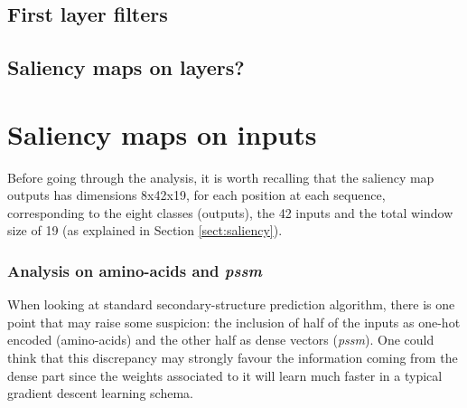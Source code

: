 \subsection{First layer filters}

\subsection*{Saliency maps on layers?}


\section{Saliency maps on inputs}

Before going through the analysis, it is worth recalling that the saliency map outputs has dimensions 8x42x19, for each position at each sequence, corresponding to the eight classes (outputs), the 42 inputs and the total window size of 19 (as explained in Section \ref{sect:saliency}).


\subsubsection*{Analysis on amino-acids and \textit{pssm}}
When looking at standard secondary-structure prediction algorithm, there is one point that may raise some suspicion: the inclusion of half of the inputs as one-hot encoded (amino-acids) and the other half as dense vectors (\textit{pssm}). One could think that this discrepancy may strongly favour the information coming from the dense part since the weights associated to it will learn much faster in a typical gradient descent learning schema.


